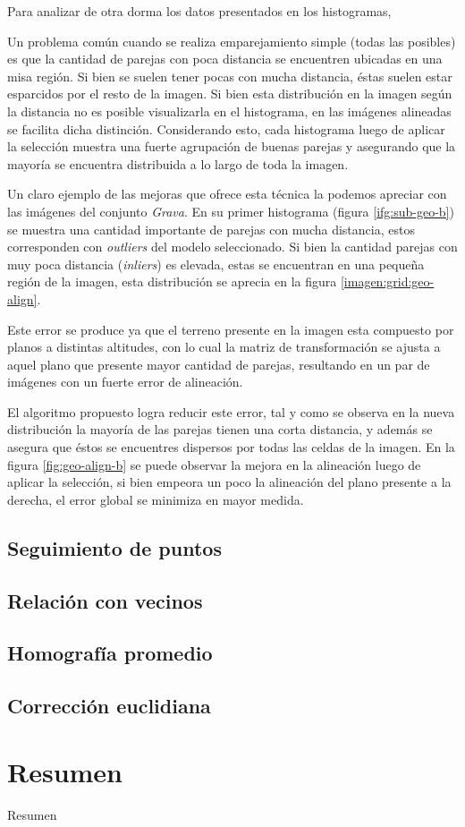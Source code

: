 Para analizar de otra dorma los datos presentados en los histogramas, 

Un problema común cuando se realiza emparejamiento simple (todas las posibles) es que la cantidad de parejas con poca distancia se encuentren ubicadas en una misa región. Si bien se suelen tener pocas con mucha distancia, éstas suelen estar esparcidos por el resto de la imagen. Si bien esta distribución en la imagen según la distancia no es posible visualizarla en el histograma, en las imágenes alineadas se facilita dicha distinción. Considerando esto, cada histograma luego de aplicar la selección muestra una fuerte agrupación de buenas parejas y asegurando que la mayoría se encuentra distribuida a lo largo de toda la imagen.

Un claro ejemplo de las mejoras que ofrece esta técnica la podemos apreciar con las imágenes del conjunto \textit{Grava}. En su primer histograma (figura \ref{ifg:sub-geo-b}) se muestra una cantidad importante de parejas con mucha distancia, estos corresponden con \textit{outliers} del modelo seleccionado. Si bien la cantidad parejas con muy poca distancia (\textit{inliers}) es elevada, estas se encuentran en una pequeña región de la imagen, esta distribución se aprecia en la figura \ref{imagen:grid:geo-align}. 

Este error se produce ya que el terreno presente en la imagen esta compuesto por planos a distintas altitudes, con lo cual la matriz de transformación se ajusta a aquel plano que presente mayor cantidad de parejas, resultando en un par de imágenes con un fuerte error de alineación. 

El algoritmo propuesto logra reducir este error, tal y como se observa en la nueva distribución la mayoría de las parejas tienen una corta distancia, y además se asegura que éstos se encuentres dispersos por todas las celdas de la imagen. En la figura \ref{fig:geo-align-b} se puede observar la mejora en la alineación luego de aplicar la selección, si bien empeora un poco la alineación del plano presente a la derecha, el error global se minimiza en mayor medida. 

\subsection*{Seguimiento de puntos}

\subsection*{Relación con vecinos}

\subsection*{Homografía promedio}

\subsection*{Corrección euclidiana}

\section{Resumen}
Resumen




